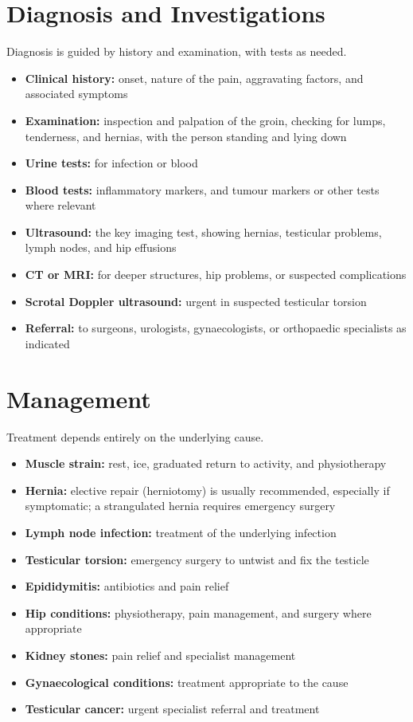 \section*{Diagnosis and Investigations}
Diagnosis is guided by history and examination, with tests as needed.

\begin{itemize}
    \item \textbf{Clinical history:} onset, nature of the pain, aggravating factors, and associated symptoms
    \item \textbf{Examination:} inspection and palpation of the groin, checking for lumps, tenderness, and hernias, with the person standing and lying down
    \item \textbf{Urine tests:} for infection or blood
    \item \textbf{Blood tests:} inflammatory markers, and tumour markers or other tests where relevant
    \item \textbf{Ultrasound:} the key imaging test, showing hernias, testicular problems, lymph nodes, and hip effusions
    \item \textbf{CT or MRI:} for deeper structures, hip problems, or suspected complications
    \item \textbf{Scrotal Doppler ultrasound:} urgent in suspected testicular torsion
    \item \textbf{Referral:} to surgeons, urologists, gynaecologists, or orthopaedic specialists as indicated
\end{itemize}

\section*{Management}
Treatment depends entirely on the underlying cause.

\begin{itemize}
    \item \textbf{Muscle strain:} rest, ice, graduated return to activity, and physiotherapy
    \item \textbf{Hernia:} elective repair (herniotomy) is usually recommended, especially if symptomatic; a strangulated hernia requires emergency surgery
    \item \textbf{Lymph node infection:} treatment of the underlying infection
    \item \textbf{Testicular torsion:} emergency surgery to untwist and fix the testicle
    \item \textbf{Epididymitis:} antibiotics and pain relief
    \item \textbf{Hip conditions:} physiotherapy, pain management, and surgery where appropriate
    \item \textbf{Kidney stones:} pain relief and specialist management
    \item \textbf{Gynaecological conditions:} treatment appropriate to the cause
    \item \textbf{Testicular cancer:} urgent specialist referral and treatment
\end{itemize}

